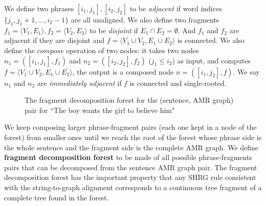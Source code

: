  We define two phrases $[i_1,j_1],[i_2,j_2]$ to be \textit{adjacent} if word indices $\{j_1,j_1+1,\ldots ,
 i_2-1\}$ are all unaligned. We also define two fragments $f_1=\langle V_1, E_1 \rangle, f_2=\langle V_2, E_2\rangle$ to be \textit{disjoint}
if $E_1 \cap E_2 = \emptyset$. And $f_1$ and $f_2$ are
adjacent if they are disjoint and $f = \langle V_1 \cup V_2, E_1 \cup E_2\rangle$ is connected.
We also define the $compose$ operation of two nodes: it takes
two nodes $n_1=([i_1, j_1], f_1)$ and $n_2=([i_2, j_2], f_2)$ ($j_1 \leq i_2$) as input, and computes $f = \langle V_1 \cup V_2, E_1 \cup E_2\rangle$,
the output is a composed node $n=([i_1, j_2], f)$. We say $n_1$ and $n_2$ are \textit{immediately adjacent} if $f$ is connected and single-rooted.


\begin{figure}
\begin{center}
\caption{The fragment decomposition forest for the (sentence, AMR graph) pair for ``The boy wants the girl to believe him"}
\label{fig:decompose-example}
\vspace{-1em}
\end{center}
\end{figure}
We keep composing larger phrase-fragment pairs (each one kept in a node of the forest) from smaller ones until we reach the root of the forest whose
phrase side is the whole sentence and the fragment side is the complete AMR graph.
We define {\bf fragment decomposition forest} to be made of all possible phrase-fragments pairs that can
be decomposed from the sentence AMR graph pair. The fragment decomposition forest has the important property
that any SHRG rule consistent with the string-to-graph alignment corresponds to a continuous
tree fragment of a complete tree found in the forest. 


